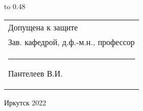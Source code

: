 \vspace{0.8cm}

{
	\noindent\hbox to 0.48\textwidth {%
		\mbox{ } \hfil} %
	\begin{tabular}[t]{l}
		Допущена к защите\\
		Зав. кафедрой, д.ф.-м.н., профессор \\
		\rule{2.7cm}{0.5pt} Пантелеев В.И.
	\end{tabular}		
}

\vspace{0.8cm}

\vfill 
\noindent
\begin{minipage}{\textwidth}
\centering	 Иркутск 2022
\end{minipage}